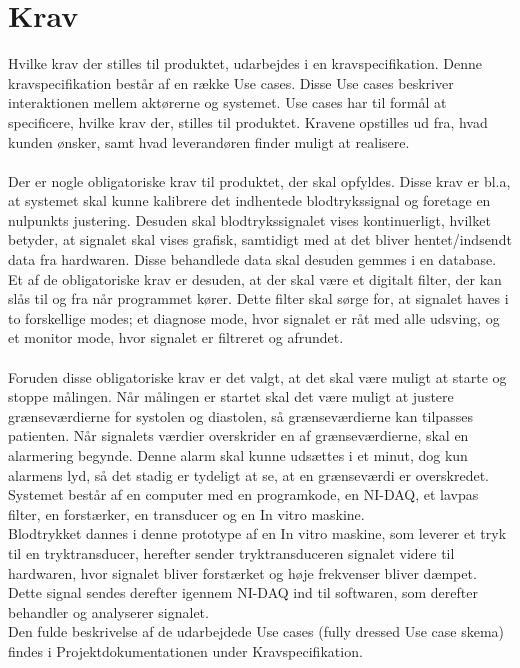\chapter{Krav}
Hvilke krav der stilles til produktet, udarbejdes i en kravspecifikation. Denne kravspecifikation består af en række Use cases. Disse Use cases beskriver interaktionen mellem aktørerne og systemet. Use cases har til formål at specificere, hvilke krav der, stilles til produktet. Kravene opstilles ud fra, hvad kunden ønsker, samt hvad leverandøren finder muligt at realisere. \\ \\
Der er nogle obligatoriske krav til produktet, der skal opfyldes. Disse krav er bl.a, at systemet skal kunne kalibrere det indhentede blodtrykssignal og foretage en nulpunkts justering. Desuden skal blodtrykssignalet vises kontinuerligt, hvilket betyder, at signalet skal vises grafisk, samtidigt med at det bliver hentet/indsendt data fra hardwaren. Disse behandlede data skal desuden gemmes i en database.
Et af de obligatoriske krav er desuden, at der skal være et digitalt filter, der kan slås til og fra når programmet kører. Dette filter skal sørge for, at signalet haves i to forskellige modes; et diagnose mode, hvor signalet er råt med alle udsving, og et monitor mode, hvor signalet er filtreret og afrundet.\\\\
Foruden disse obligatoriske krav er det valgt, at det skal være muligt at starte og stoppe målingen. Når målingen er startet skal det være muligt at justere grænseværdierne for systolen og diastolen, så grænseværdierne kan tilpasses patienten. Når signalets værdier overskrider en af grænseværdierne, skal en alarmering begynde. Denne alarm skal kunne udsættes i et minut, dog kun alarmens lyd, så det stadig er tydeligt at se, at en grænseværdi er overskredet.\\
Systemet består af en computer med en programkode, en NI-DAQ, et lavpas filter, en forstærker, en transducer og en In vitro maskine.\\
Blodtrykket dannes i denne prototype af en In vitro maskine, som leverer et tryk til en tryktransducer, herefter sender tryktransduceren signalet videre til hardwaren, hvor signalet bliver forstærket og høje frekvenser bliver dæmpet. Dette signal sendes derefter igennem NI-DAQ ind til softwaren, som derefter behandler og analyserer signalet.\\
Den fulde beskrivelse af de udarbejdede Use cases (fully dressed Use case skema) findes i Projektdokumentationen under Kravspecifikation.
